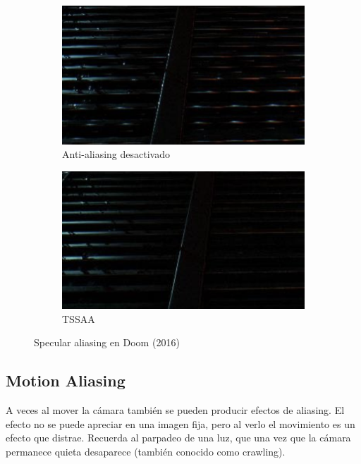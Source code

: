\documentclass[withindex, glossary]{cam-thesis}
\begin{document}
\begin{figure}[!htbp]
    \centering
    \begin{subfigure}[b]{0.8\textwidth}
        \includegraphics[width=\textwidth]{figures/specular-aliasing.png}
        \caption{Anti-aliasing desactivado}
    \end{subfigure}
    \centering
    \begin{subfigure}[b]{0.8\textwidth}
        \includegraphics[width=\textwidth]{figures/specular-fixed.png}
        \caption{TSSAA}
    \end{subfigure}
    \caption{Specular aliasing en Doom (2016)}
    \label{specular}
\end{figure}

\subsection{Motion Aliasing}

A veces al mover la cámara también se pueden producir efectos de aliasing. El efecto no se puede apreciar en una imagen fija, pero al verlo el movimiento es un efecto que distrae. Recuerda al parpadeo de una luz, que una vez que la cámara permanece quieta desaparece (también conocido como crawling).
\end{document}
